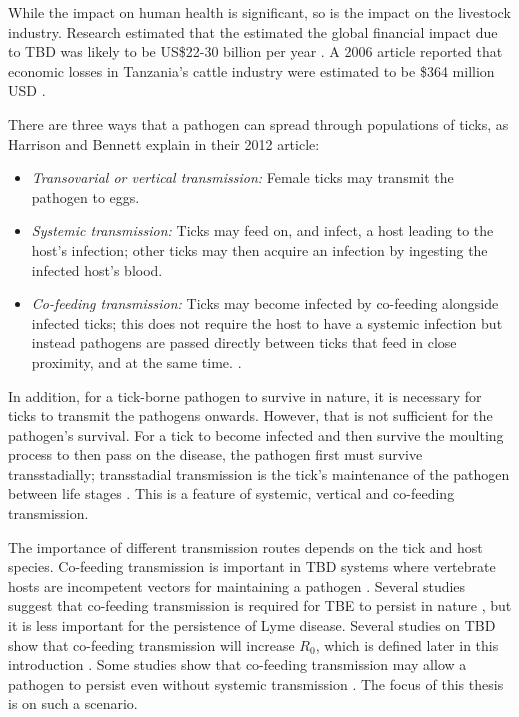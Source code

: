 \documentclass{article}
\begin{document}
While the impact on human health is significant, so is the impact on the livestock industry. Research estimated that the estimated the global financial impact due to TBD was likely to be US\$22-30 billion per year \cite{Lew_Tabor_2016}. A 2006 article reported that economic losses in Tanzania's cattle industry were estimated to be \$364 million USD \cite{Kivaria2006}.

There are three ways that a pathogen can spread through populations of ticks, as Harrison and Bennett explain in their 2012 article:
\begin{itemize}
	\item \textit{Transovarial or vertical transmission:} Female ticks may transmit the pathogen to eggs.
	\item \textit{Systemic transmission:} Ticks may feed on, and infect, a host leading to the host's infection; other ticks may then acquire an infection by ingesting the infected host's blood.
	\item \textit{Co-feeding transmission:} Ticks may become infected by co-feeding alongside infected ticks; this does not require the host to have a systemic infection but instead pathogens are passed directly between ticks that feed in close proximity, and at the same time. \cite{HARRISON2012}.
\end{itemize}

In addition, for a tick-borne pathogen to survive in nature, it is necessary for ticks to transmit the pathogens onwards. However, that is not sufficient for the pathogen's survival. For a tick to become infected and then survive the moulting process to then pass on the disease, the pathogen first must survive transstadially; transstadial transmission is the tick's maintenance of the pathogen between life stages \cite{Johnson2023d}. This is a feature of systemic, vertical and co-feeding transmission.

The importance of different transmission routes depends on the tick and host species. Co-feeding transmission is important in TBD systems where vertebrate hosts are incompetent vectors for maintaining a pathogen \cite{HARRISON2012}. Several studies suggest that co-feeding transmission is required for TBE to persist in nature \cite{Hartemink2008, HARRISON2012}, but it is less important for the persistence of Lyme disease. Several studies on TBD show that co-feeding transmission will increase $ R_0 $, which is defined later in this introduction \cite{JohnstoneRobertson2020, Rosa2003, Norman2004}. Some studies show that co-feeding transmission may allow a pathogen to persist even without systemic transmission \cite{Rosa2003, Norman2004}. The focus of this thesis is on such a scenario.
\end{document}
